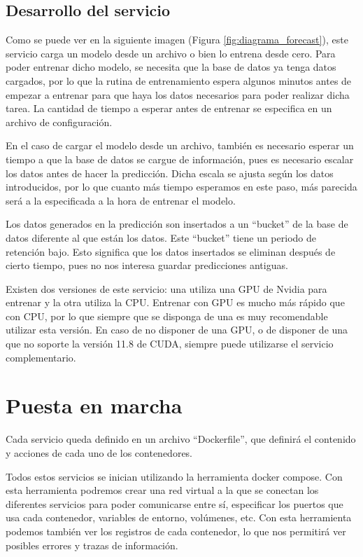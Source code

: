 \subsection{Desarrollo del servicio}

Como se puede ver en la siguiente imagen (Figura \ref{fig:diagrama_forecast}), este servicio carga un modelo desde 
un archivo o bien lo entrena desde cero. Para poder entrenar dicho modelo, se necesita que la base de datos ya tenga 
datos cargados, por lo que la rutina de entrenamiento espera algunos minutos antes de empezar a entrenar para que 
haya los datos necesarios para poder realizar dicha tarea. La cantidad de tiempo a esperar antes de entrenar se especifica 
en un archivo de configuración.

En el caso de cargar el modelo desde un archivo, también es necesario esperar un tiempo a que la base de datos se cargue 
de información, pues es necesario escalar los datos antes de hacer la predicción. Dicha escala se ajusta según los datos 
introducidos, por lo que cuanto más tiempo esperamos en este paso, más parecida será a la especificada a la hora
de entrenar el modelo.

Los datos generados en la predicción son insertados a un ``bucket'' de la base de datos diferente al que están los datos.
Este ``bucket'' tiene un periodo de retención bajo. Esto significa que los datos insertados se eliminan después 
de cierto tiempo, pues no nos interesa guardar predicciones antiguas.

Existen dos versiones de este servicio: una utiliza una GPU de Nvidia para entrenar y la otra utiliza la CPU. Entrenar con
GPU es mucho más rápido que con CPU, por lo que siempre que se disponga de una es muy recomendable utilizar esta versión.
En caso de no disponer de una GPU, o de disponer de una que no soporte la versión 11.8 de CUDA, siempre puede utilizarse el 
servicio complementario.


\section{Puesta en marcha}

Cada servicio queda definido en un archivo ``Dockerfile'', que definirá el contenido y acciones de cada uno de los 
contenedores.

Todos estos servicios se inician utilizando la herramienta docker compose. Con esta herramienta podremos crear
una red virtual a la que se conectan los diferentes servicios para poder comunicarse entre sí, especificar los
puertos que usa cada contenedor, variables de entorno, volúmenes, etc. Con esta herramienta podemos también ver los registros de cada contenedor, lo que nos permitirá ver posibles errores 
y trazas de información.

